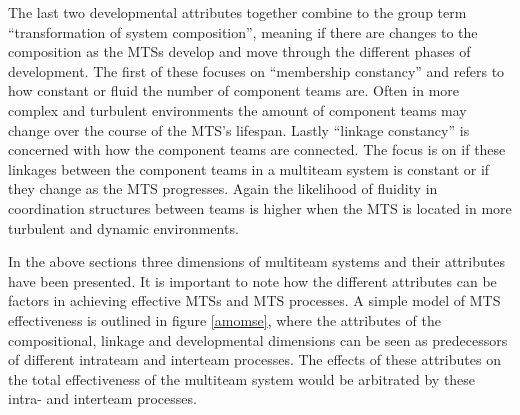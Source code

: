 The last two developmental attributes together combine to the group term ``transformation of system composition'', meaning if there are changes to the composition as the MTSs develop and move through the different phases of development. The first of these focuses on ``membership constancy'' and refers to how constant or fluid the number of component teams are. Often in more complex and turbulent environments the amount of component teams may change over the course of the MTS's lifespan. Lastly ``linkage constancy'' is concerned with how the component teams are connected. The focus is on if these linkages between the component teams in a multiteam system is constant or if they change as the MTS progresses. Again the likelihood of fluidity in coordination structures between teams is higher when the MTS is located in more turbulent and dynamic environments.

In the above sections three dimensions of multiteam systems and their attributes have been presented. It is important to note how the different attributes can be factors in achieving effective MTSs and MTS processes. A simple model of MTS effectiveness is outlined in figure \ref{amomse}, where the attributes of the compositional, linkage and developmental dimensions can be seen as predecessors of different intrateam and interteam processes. The effects of these attributes on the total effectiveness of the multiteam system would be arbitrated by these intra- and interteam processes.

